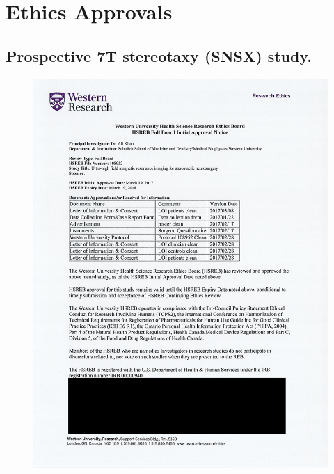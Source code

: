 \chapter{Ethics Approvals}\label{app:ethics}

\newpage
\section{Prospective 7T stereotaxy (SNSX) study.}\label{app:ethics:reb_details}
\begin{figure}[hbt!]
    \centering
    \includegraphics[width=0.9\linewidth]{figs/EthicsA.png}
    \label{fig:enter-label}
\end{figure}

\newpage
